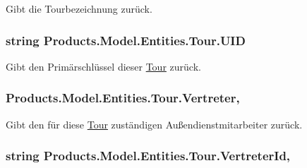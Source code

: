 Gibt die Tourbezeichnung zurück. 

\subsubsection[{\texorpdfstring{U\+ID}{UID}}]{\setlength{\rightskip}{0pt plus 5cm}string Products.\+Model.\+Entities.\+Tour.\+U\+ID\hspace{0.3cm}{\ttfamily [get]}}\hypertarget{class_products_1_1_model_1_1_entities_1_1_tour_a60d7092a6547742aec97548b2550ea09}{}\label{class_products_1_1_model_1_1_entities_1_1_tour_a60d7092a6547742aec97548b2550ea09}


Gibt den Primärschlüssel dieser \hyperlink{class_products_1_1_model_1_1_entities_1_1_tour}{Tour} zurück. 

\subsubsection[{\texorpdfstring{Vertreter}{Vertreter}}]{ Products.\+Model.\+Entities.\+Tour.\+Vertreter\hspace{0.3cm}{\ttfamily [get]}, {\ttfamily [set]}}\hypertarget{class_products_1_1_model_1_1_entities_1_1_tour_a85649f8b27f12da54eaf65876b440add}{}\label{class_products_1_1_model_1_1_entities_1_1_tour_a85649f8b27f12da54eaf65876b440add}


Gibt den für diese \hyperlink{class_products_1_1_model_1_1_entities_1_1_tour}{Tour} zuständigen Außendienstmitarbeiter zurück. 

\subsubsection[{\texorpdfstring{Vertreter\+Id}{VertreterId}}]{\setlength{\rightskip}{0pt plus 5cm}string Products.\+Model.\+Entities.\+Tour.\+Vertreter\+Id\hspace{0.3cm}{\ttfamily [get]}, {\ttfamily [set]}}\hypertarget{class_products_1_1_model_1_1_entities_1_1_tour_ae59a9753e62275238c29e72e2063ff4a}{}\label{class_products_1_1_model_1_1_entities_1_1_tour_ae59a9753e62275238c29e72e2063ff4a}


